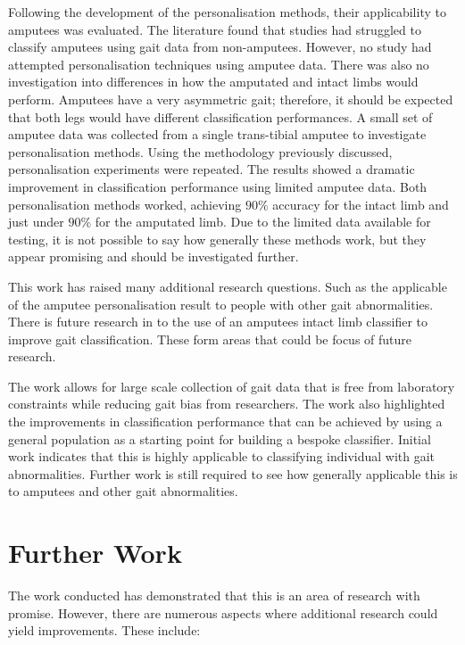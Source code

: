 Following the development of the personalisation methods, their applicability to amputees was evaluated. The literature found that studies had struggled to classify amputees using gait data from non-amputees. However, no study had attempted personalisation techniques using amputee data. There was also no investigation into differences in how the amputated and intact limbs would perform. Amputees have a very asymmetric gait; therefore, it should be expected that both legs would have different classification performances. A small set of amputee data was collected from a single trans-tibial amputee to investigate personalisation methods. Using the methodology previously discussed, personalisation experiments were repeated. The results showed a dramatic improvement in classification performance using limited amputee data. Both personalisation methods worked, achieving $90\%$ accuracy for the intact limb and just under $90\%$ for the amputated limb. Due to the limited data available for testing, it is not possible to say how generally these methods work, but they appear promising and should be investigated further.

This work has raised many additional research questions. Such as the applicable of the amputee personalisation result to people with other gait abnormalities. There is future research in to the use of an amputees intact limb classifier to improve gait classification. These form areas that could be focus of future research.

The work allows for large scale collection of gait data that is free from laboratory constraints while reducing gait bias from researchers. The work also highlighted the improvements in classification performance that can be achieved by using a general population as a starting point for building a bespoke classifier. Initial work indicates that this is highly applicable to classifying individual with gait abnormalities. Further work is still required to see how generally applicable this is to amputees and other gait abnormalities.

\section{Further Work} %
The work conducted has demonstrated that this is an area of research with promise. However, there are numerous aspects where additional research could yield improvements. These include:

